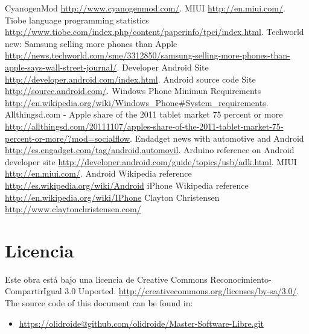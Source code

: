 \documentclass[11pt]{article}
\begin{document}
\begin{thebibliography}{11}

 CyanogenMod \url{http://www.cyanogenmod.com/}.
 MIUI \url{http://en.miui.com/}.
 Tiobe language programming statistics \url{http://www.tiobe.com/index.php/content/paperinfo/tpci/index.html}.
 Techworld new: Samsung selling more phones than Apple \url{http://news.techworld.com/sme/3312850/samsung-selling-more-phones-than-apple-says-wall-street-journal/}.
 Developer Android Site \url{http://developer.android.com/index.html}.
 Android source code Site \url{http://source.android.com/}.
 Windows Phone Minimun Requirements \url{http://en.wikipedia.org/wiki/Windows_Phone#System_requirements}.
 Allthingsd.com - Apple share of the 2011 tablet market 75 percent or more \url{http://allthingsd.com/20111107/apples-share-of-the-2011-tablet-market-75-percent-or-more/?mod=socialflow}.
 Endadget news with automotive and Android \url{http://es.engadget.com/tag/android,automovil}.
 Arduino reference on Android developer site \url{http://developer.android.com/guide/topics/usb/adk.html}.
 MIUI \url{http://en.miui.com/}.
 Android Wikipedia reference \url{http://es.wikipedia.org/wiki/Android}
 iPhone Wikipedia reference \url{http://en.wikipedia.org/wiki/IPhone}
 Clayton Christensen \url{http://www.claytonchristensen.com/}


\end{thebibliography}

\section{Licencia}
Este obra está bajo una licencia de Creative Commons Reconocimiento-CompartirIgual 3.0 Unported. \url{http://creativecommons.org/licenses/by-sa/3.0/}.
The source code of this document can be found in:
	\begin{itemize}
		\item \url{https://olidroide@github.com/olidroide/Master-Software-Libre.git}
	\end{itemize}
    \begin{center}
    \end{center}
\end{document}

